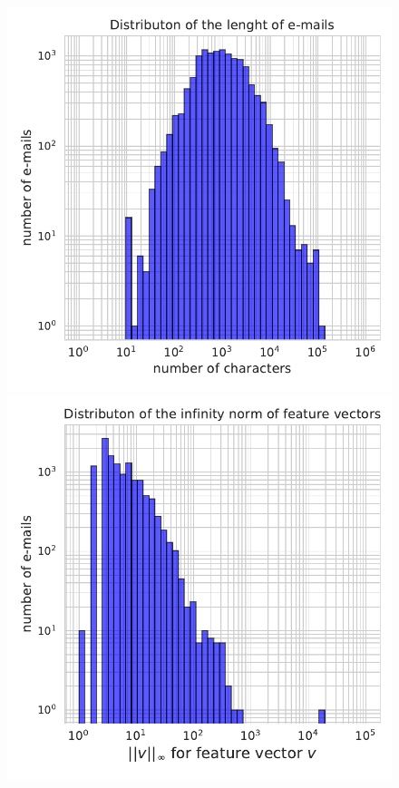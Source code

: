 \documentclass[11pt]{article}
\begin{document}
\begin{figure}
\begin{minipage}[t]{0.3\textwidth}
\includegraphics[width=1\linewidth]{email_spam/char_count.pdf}
\end{minipage}
\begin{minipage}[t]{0.3\textwidth}
\includegraphics[width=1\linewidth]{email_spam/word_count.pdf}

\end{minipage}
\end{figure}
\end{document}
